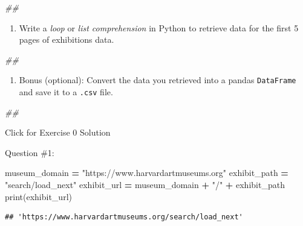 \documentclass[
]{book}
\newenvironment{Shaded}{\begin{snugshade}}{\end{snugshade}}
\newcommand{\BuiltInTok}[1]{#1}
\newcommand{\CommentTok}[1]{\textcolor[rgb]{0.56,0.35,0.01}{\textit{#1}}}
\newcommand{\NormalTok}[1]{#1}
\newcommand{\OperatorTok}[1]{\textcolor[rgb]{0.81,0.36,0.00}{\textbf{#1}}}
\newcommand{\StringTok}[1]{\textcolor[rgb]{0.31,0.60,0.02}{#1}}
\providecommand{\tightlist}{%
  \setlength{\itemsep}{0pt}\setlength{\parskip}{0pt}}
\begin{document}
\begin{Shaded}
\begin{Highlighting}[]
\CommentTok{\#\#}
\end{Highlighting}
\end{Shaded}

\begin{enumerate}
\def\labelenumi{\arabic{enumi}.}
\setcounter{enumi}{2}
\tightlist
\item
  Write a \emph{loop} or \emph{list comprehension} in Python to retrieve data
  for the first 5 pages of exhibitions data.
\end{enumerate}

\begin{Shaded}
\begin{Highlighting}[]
\CommentTok{\#\#}
\end{Highlighting}
\end{Shaded}

\begin{enumerate}
\def\labelenumi{\arabic{enumi}.}
\setcounter{enumi}{3}
\tightlist
\item
  Bonus (optional): Convert the data you retrieved into a pandas
  \texttt{DataFrame} and save it to a \texttt{.csv} file.
\end{enumerate}

\begin{Shaded}
\begin{Highlighting}[]
\CommentTok{\#\#}
\end{Highlighting}
\end{Shaded}

{Click for Exercise 0 Solution}

Question \#1:

\begin{Shaded}
\begin{Highlighting}[]
\NormalTok{museum\_domain }\OperatorTok{=} \StringTok{"https://www.harvardartmuseums.org"}
\NormalTok{exhibit\_path }\OperatorTok{=} \StringTok{"search/load\_next"}
\NormalTok{exhibit\_url }\OperatorTok{=}\NormalTok{ museum\_domain }\OperatorTok{+} \StringTok{"/"} \OperatorTok{+}\NormalTok{ exhibit\_path}
\BuiltInTok{print}\NormalTok{(exhibit\_url)}
\end{Highlighting}
\end{Shaded}

\begin{verbatim}
## 'https://www.harvardartmuseums.org/search/load_next'
\end{verbatim}
\end{document}
